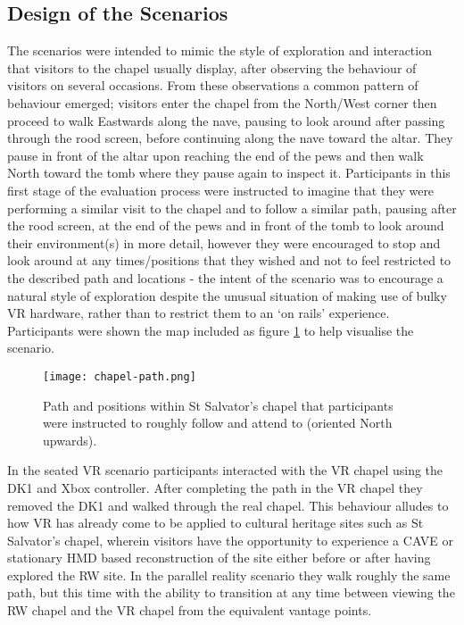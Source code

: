 
\subsection{Design of the Scenarios}

The scenarios were intended to mimic the style of exploration and interaction that visitors to the chapel usually display, after observing the behaviour of visitors on several occasions. From these observations a common pattern of behaviour emerged; visitors enter the chapel from the North/West corner then proceed to walk Eastwards along the nave, pausing to look around after passing through the rood screen, before continuing along the nave toward the altar. They pause in front of the altar upon reaching the end of the pews and then walk North toward the tomb where they pause again to inspect it. Participants in this first stage of the evaluation process were instructed to imagine that they were performing a similar visit to the chapel and to follow a similar path, pausing after the rood screen, at the end of the pews and in front of the tomb to look around their environment(s) in more detail, however they were encouraged to stop and look around at any times/positions that they wished and not to feel restricted to the described path and locations - the intent of the scenario was to encourage a natural style of exploration despite the unusual situation of making use of bulky VR hardware, rather than to restrict them to an `on rails' experience. Participants were shown the map included as figure \ref{chapel-path} to help visualise the scenario.

\begin{figure}
	\begin{center}
		\texttt{[image: chapel-path.png]}
		\caption{Path and positions within St Salvator's chapel that participants were instructed to roughly follow and attend to (oriented North upwards).}
		\label{chapel-path}
	\end{center}
\end{figure}

In the seated VR scenario participants interacted with the VR chapel using the DK1 and Xbox controller. After completing the path in the VR chapel they removed the DK1 and walked through the real chapel. This behaviour alludes to how VR has already come to be applied to cultural heritage sites such as St Salvator's chapel, wherein visitors have the opportunity to experience a CAVE or stationary HMD based reconstruction of the site either before or after having explored the RW site. In the parallel reality scenario they walk roughly the same path, but this time with the ability to transition at any time between viewing the RW chapel and the VR chapel from the equivalent vantage points.

